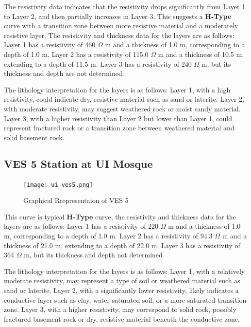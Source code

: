 \documentclass[12pt,a4paper]{report}
\begin{document}
The resistivity data indicates that the resistivity drops significantly from Layer 1 to Layer 2, and then partially increases in Layer 3. This suggests a \textbf{H-Type} curve with a transition zone between more resistive material and a moderately resistive layer. The resistivity and thickness data for the layers are as follows: Layer 1 has a resistivity of 460 $\Omega$ m and a thickness of 1.0 m, corresponding to a depth of 1.0 m. Layer 2 has a resistivity of 115.0 $\Omega$ m and a thickness of 10.5 m, extending to a depth of 11.5 m. Layer 3 has a resistivity of 240 $\Omega$ m, but its thickness and depth are not determined.

The lithology interpretation for the layers is as follows: Layer 1, with a high resistivity, could indicate dry, resistive material such as sand or laterite. Layer 2, with moderate resistivity, may suggest weathered rock or moist sandy material. Layer 3, with a higher resistivity than Layer 2 but lower than Layer 1, could represent fractured rock or a transition zone between weathered material and solid basement rock.

\subsection{VES 5 Station at UI Mosque}

\begin{figure}[H]
    \centering
    \texttt{[image: ui\_ves5.png]}
    \caption{Graphical Rrepresentaion of VES 5}
    \label{fig:VES_5_Curve}
\end{figure}

This curve is typical \textbf{H-Type} curve, the resistivity and thickness data for the layers are as follows: Layer 1 has a resistivity of 220 $\Omega$ m and a thickness of 1.0 m, corresponding to a depth of 1.0 m. Layer 2 has a resistivity of 94.3 $\Omega$ m and a thickness of 21.0 m, extending to a depth of 22.0 m. Layer 3 has a resistivity of 364 $\Omega$ m, but its thickness and depth not determined

The lithology interpretation for the layers is as follows: Layer 1, with a relatively moderate resistivity, may represent a type of soil or weathered material such as sand or laterite. Layer 2, with a significantly lower resistivity, likely indicates a conductive layer such as clay, water-saturated soil, or a more saturated transition zone. Layer 3, with a higher resistivity, may correspond to solid rock, possibly fractured basement rock or dry, resistive material beneath the conductive zone.
\end{document}
